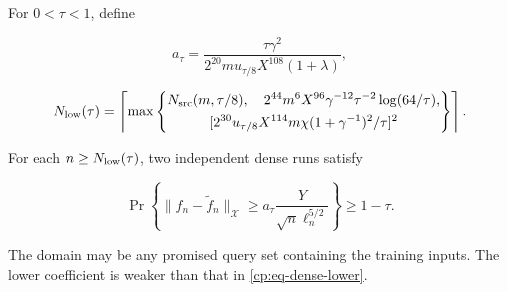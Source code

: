 For $0<\tau<1$, define

\[
a_\tau=\frac{\tau\gamma^2}
 {2^{20}m u_{\tau/8}X^{108}(1+\lambda)},
\]

\begin{equation}
N_{\rm low}(\tau)=\left\lceil\max\left\{\begin{gathered}
 N_{\rm src}(m,\tau/8),\quad
 2^{44}m^6X^{96}\gamma^{-12}\tau^{-2}\log(64/\tau),\\
 [2^{30}u_{\tau/8}X^{114}m\chi(1+\gamma^{-1})^2/\tau]^2
 \end{gathered}\right\}\right\rceil.
\label{cp:poly:eq:lower-width}
\end{equation}

\begin{proposition}
\label{cp:poly:dense-lower}

For each $n\ge N_{\rm low}(\tau)$, two independent dense runs satisfy

\begin{equation}
\Pr\left\{\|f_n-\widetilde f_n\|_{\mathcal X}
       \ge a_\tau\frac{Y}{\sqrt n\ell_n^{5/2}}\right\}\ge1-\tau.
\label{cp:poly:eq:dense-lower}
\end{equation}

The domain may be any promised query set containing the training inputs.
The lower coefficient is weaker than that in \eqref{cp:eq-dense-lower}.

\end{proposition}

